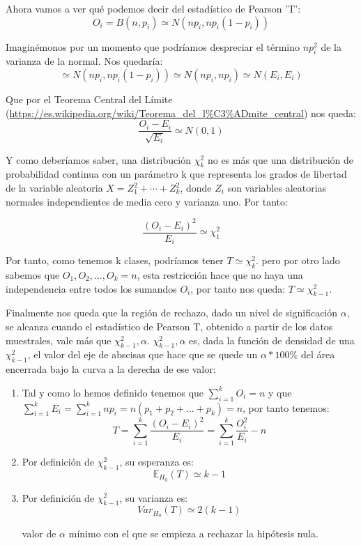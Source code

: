 \documentclass[nochap]{apuntes}
\begin{document}
Ahora vamos a ver qué podemos decir del estadístico de Pearson 'T':
\[
O_i=B(n,p_i) \simeq N(np_i, np_i(1-p_i))
\]

Imaginémonos por un momento que podríamos despreciar el término $np_i^2$ de la varianza de la normal. Nos quedaría:
\[
\simeq N(np_i, np_i(1-p_i)) \simeq N(np_i, np_i) \simeq N(E_i, E_i)
\]

Que por el Teorema Central del Límite (\url{https://es.wikipedia.org/wiki/Teorema_del_l%C3%ADmite_central}) nos queda:
\[
\frac{O_i-E_i}{\sqrt{E_i}} \simeq N(0,1)
\]

Y como deberíamos saber, una distribución $\chi^2_k$  no es más que una distribución de probabilidad continua con un parámetro k que representa los grados de libertad de la variable aleatoria $X = Z_1^2 + \cdots + Z_k^2$, donde $Z_i$ son variables aleatorias normales independientes de media cero y varianza uno. Por tanto:

\[
\frac{(O_i-E_i)^2}{E_i} \simeq \chi^2_1
\]

Por tanto, como tenemos k clases, podríamos tener $T\simeq \chi^2_k$. pero por otro lado sabemos que $O_1,O_2,...,O_k=n$, esta restricción hace que no haya una independencia entre todos los sumandos $O_i$, por tanto nos queda: $T\simeq \chi^2_{k-1}$.

Finalmente nos queda que la región de rechazo, dado un nivel de significación $\alpha$, se alcanza cuando el estadístico de Pearson T, obtenido a partir de los datos muestrales, vale más que $\chi^2_{k-1}, \alpha$. $\chi^2_{k-1}, \alpha$ es, dada la función de densidad de una $\chi^2_{k-1}$, el valor del eje de abscisas que hace que se quede un $\alpha*100\%$ del área encerrada bajo la curva a la derecha de ese valor:


\obs
\begin{enumerate}
\item  Tal y como lo hemos definido tenemos que $\sum_{i=1}^k O_i = n$ y que $\sum_{i=1}^k E_i = \sum_{i=1}^k np_i= n(p_1+p_2+...+p_k) = n$, por tanto tenemos:
\[
T=\sum_{i=1}^k \frac{(O_i-E_i)^2}{E_i} = \sum_{i=1}^k \frac{O_i^2}{E_i}-n
\]

\item Por definición de $\chi^2_{k-1}$, su esperanza es:
\[
\mathbb{E}_{H_0}(T) \simeq k-1
\]

\item Por definición de $\chi^2_{k-1}$, su varianza es:
\[
Var_{H_0}(T) \simeq 2(k-1)
\]

\begin{defn}[p-valor]
valor de $\alpha$ mínimo con el que se empieza a rechazar la hipótesis nula.
\end{defn}

\end{enumerate}
\end{document}
